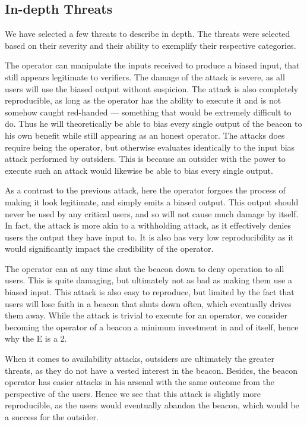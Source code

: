\subsection{In-depth Threats}
We have selected a few threats to describe in depth. The threats were selected based on their severity and their ability to exemplify their respective categories.

The operator can manipulate the inputs received to produce a biased input, that still appears legitimate to verifiers. The damage of the attack is severe, as all users will use the biased output without suspicion. The attack is also completely reproducible, as long as the operator has the ability to execute it and is not somehow caught red-handed --- something that would be extremely difficult to do. Thus he will theoretically be able to bias every single output of the beacon to his own benefit while still appearing as an honest operator. The attacks does require being the operator, but otherwise evaluates identically to the input bias attack performed by outsiders. This is because an outsider with the power to execute such an attack would likewise be able to bias every single output.

As a contrast to the previous attack, here the operator forgoes the process of making it look legitimate, and simply emits a biased output. This output should never be used by any critical users, and so will not cause much damage by itself. In fact, the attack is more akin to a withholding attack, as it effectively denies users the output they have input to. It is also has very low reproducibility as it would significantly impact the credibility of the operator.

The operator can at any time shut the beacon down to deny operation to all users. This is quite damaging, but ultimately not as bad as making them use a biased input. This attack is also easy to reproduce, but limited by the fact that users will lose faith in a beacon that shuts down often, which eventually drives them away. While the attack is trivial to execute for an operator, we consider becoming the operator of a beacon a minimum investment in and of itself, hence why the E is a 2.

When it comes to availability attacks, outsiders are ultimately the greater threats, as they do not have a vested interest in the beacon. Besides, the beacon operator has easier attacks in his arsenal with the same outcome from the perspective of the users. Hence we see that this attack is slightly more reproducible, as the users would eventually abandon the beacon, which would be a success for the outsider.